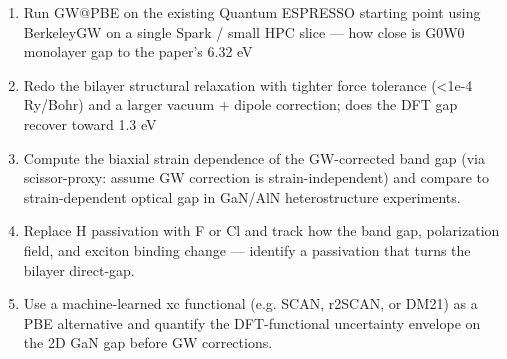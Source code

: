 \begin{enumerate}[leftmargin=1.6em,itemsep=0.2em,topsep=0.2em,label=Q\arabic*.]
\item Run GW@PBE on the existing Quantum ESPRESSO starting point using BerkeleyGW on a single Spark / small HPC slice --- how close is G0W0 monolayer gap to the paper's 6.32 eV
\item Redo the bilayer structural relaxation with tighter force tolerance (\textless{}1e-4 Ry/Bohr) and a larger vacuum + dipole correction; does the DFT gap recover toward 1.3 eV
\item Compute the biaxial strain dependence of the GW-corrected band gap (via scissor-proxy: assume GW correction is strain-independent) and compare to strain-dependent optical gap in GaN/AlN heterostructure experiments.
\item Replace H passivation with F or Cl and track how the band gap, polarization field, and exciton binding change --- identify a passivation that turns the bilayer direct-gap.
\item Use a machine-learned xc functional (e.g. SCAN, r2SCAN, or DM21) as a PBE alternative and quantify the DFT-functional uncertainty envelope on the 2D GaN gap before GW corrections.
\end{enumerate}

